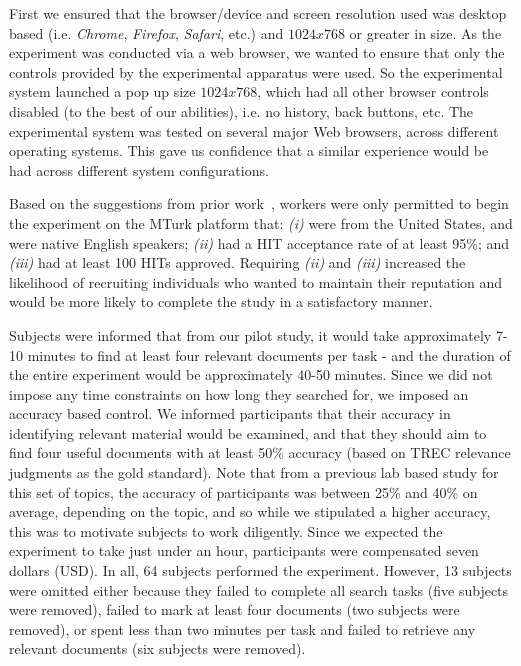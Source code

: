 First we ensured that the browser/device and screen resolution used was desktop based (i.e. \emph{Chrome}, \emph{Firefox}, \emph{Safari}, etc.) and $1024x768$ or greater in size. As the experiment was conducted via a web browser, we wanted to ensure that only the controls provided by the experimental apparatus were used. So the experimental system launched a pop up size $1024x768$, which had all other browser controls disabled (to the best of our abilities), i.e. no history, back buttons, etc. The experimental system was tested on several major Web browsers, across different operating systems. This gave us confidence that a similar experience would be had across different system configurations.

Based on the suggestions from prior work~\cite{feild2010turkers,zuccon2013crowdsourcing,bota2016playing_your_cards}, workers were only permitted to begin the experiment on the MTurk platform that: \emph{(i)} were from the United States, and were native English speakers; \emph{(ii)} had a HIT acceptance rate of at least 95\%; and \emph{(iii)} had at least 100 HITs approved. Requiring \emph{(ii)} and \emph{(iii)} increased the likelihood of recruiting individuals who wanted to maintain their reputation and would be more likely to complete the study in a satisfactory manner. 

Subjects were informed that from our pilot study, it would take approximately 7-10 minutes to find at least four relevant documents per task - and the duration of the entire experiment would be approximately 40-50 minutes. Since we did not impose any time constraints on how long they searched for, we imposed an accuracy based control. We informed participants that their accuracy in identifying relevant material would be examined, and that they should aim to find four useful documents with at least 50\% accuracy (based on TREC relevance judgments as the gold standard). Note that from a previous lab based study for this set of topics, the accuracy of participants was between 25\% and 40\% on average, depending on the topic, and so while we stipulated a higher accuracy, this was to motivate subjects to work diligently. Since we expected the experiment to take just under an hour, participants were compensated seven dollars (USD). In all, 64 subjects performed the experiment. However, 13 subjects were omitted either because they failed to complete all search tasks (five subjects were removed), failed to mark at least four documents (two subjects were removed), or spent less than two minutes per task and failed to retrieve any relevant documents (six subjects were removed). 

